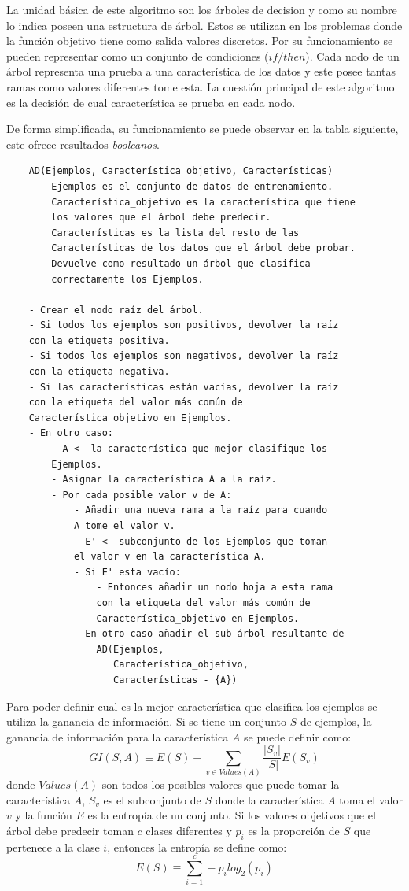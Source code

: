 La unidad básica de este algoritmo son los árboles de decision y como su nombre lo indica poseen una estructura de árbol. Estos se utilizan en los problemas donde la función objetivo tiene como salida valores discretos. Por su funcionamiento se pueden representar como un conjunto de condiciones ($if/then$). Cada nodo de un árbol representa una prueba a una característica de los datos y este posee tantas ramas como valores diferentes tome esta. La cuestión principal de este algoritmo es la decisión de cual característica se prueba en cada nodo.

De forma simplificada, su funcionamiento se puede observar en la tabla siguiente, este ofrece resultados \textit{booleanos}.

\begin{verbatim}
    AD(Ejemplos, Característica_objetivo, Características)
        Ejemplos es el conjunto de datos de entrenamiento.
        Característica_objetivo es la característica que tiene
        los valores que el árbol debe predecir.
        Características es la lista del resto de las
        Características de los datos que el árbol debe probar.
        Devuelve como resultado un árbol que clasifica
        correctamente los Ejemplos.

    - Crear el nodo raíz del árbol.
    - Si todos los ejemplos son positivos, devolver la raíz
    con la etiqueta positiva.
    - Si todos los ejemplos son negativos, devolver la raíz
    con la etiqueta negativa.
    - Si las características están vacías, devolver la raíz
    con la etiqueta del valor más común de
    Característica_objetivo en Ejemplos.
    - En otro caso:
        - A <- la característica que mejor clasifique los
        Ejemplos.
        - Asignar la característica A a la raíz.
        - Por cada posible valor v de A:
            - Añadir una nueva rama a la raíz para cuando
            A tome el valor v.
            - E' <- subconjunto de los Ejemplos que toman
            el valor v en la característica A.
            - Si E' esta vacío:
                - Entonces añadir un nodo hoja a esta rama
                con la etiqueta del valor más común de
                Característica_objetivo en Ejemplos.
            - En otro caso añadir el sub-árbol resultante de
                AD(Ejemplos, 
                   Característica_objetivo, 
                   Características - {A})
\end{verbatim}

Para poder definir cual es la mejor característica que clasifica los ejemplos se utiliza la ganancia de información. Si se tiene un conjunto $S$ de ejemplos, la ganancia de información para la característica $A$ se puede definir como:
\[GI(S, A) \equiv E(S) - \sum_{v \in Values(A)} \frac{|S_{v}|}{|S|}E(S_{v})\]
donde $Values(A)$ son todos los posibles valores que puede tomar la característica $A$, $S_{v}$ es el subconjunto de $S$ donde la característica $A$ toma el valor $v$ y la función $E$ es la entropía de un conjunto. Si los valores objetivos que el árbol debe predecir toman $c$ clases diferentes y $p_{i}$ es la proporción de $S$ que pertenece a la clase $i$, entonces la entropía se define como:
\[E(S) \equiv \sum_{i=1}^c -p_{i}log_{2}(p_{i})\]


